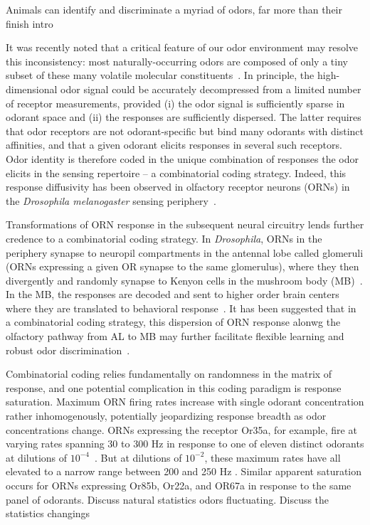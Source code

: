 
Animals can identify and discriminate a myriad of odors, far more than their {\color{blue} finish intro}

It was recently noted that a critical feature of our odor environment may resolve this inconsistency: most naturally-occurring odors are composed of only a tiny subset of these many volatile molecular constituents~\cite{vijay_1}. In principle, the high-dimensional odor signal could be accurately decompressed from a limited number of receptor measurements, provided (i) the odor signal is sufficiently sparse in odorant space and (ii) the responses are sufficiently dispersed. The latter requires that odor receptors are not odorant-specific but bind many odorants with distinct affinities, and that a given odorant elicits responses in several such receptors. Odor identity is therefore coded in the unique combination of responses the odor elicits in the sensing repertoire -- a combinatorial coding strategy. Indeed, this response diffusivity has been observed in olfactory receptor neurons (ORNs) in the  \textit{Drosophila melanogaster} sensing periphery~\cite{hallem_carlson}. 

Transformations of ORN response in the subsequent neural circuitry lends further credence to a combinatorial coding strategy. In \textit{Drosophila}, ORNs in the periphery synapse to neuropil compartments in the antennal lobe called glomeruli (ORNs expressing a given OR synapse to the same glomerulus), where they then divergently and randomly synapse to Kenyon cells in the mushroom body (MB)~\cite{early_olfactory_processing, abbott_axel}. In the MB, the responses are decoded and sent to higher order brain centers where they are translated to behavioral response~\cite{olfactory_map_chiang, mushroom_body_review}. It has been suggested that in a combinatorial coding strategy, this dispersion of ORN response alonwg the olfactory pathway from AL to MB may further facilitate flexible learning and robust odor discrimination~\cite{vijay_1}. 

Combinatorial coding relies fundamentally on randomness in the matrix of response, and one potential complication in this coding paradigm is response saturation. Maximum ORN firing rates increase with single odorant concentration rather inhomogenously, potentially jeopardizing response breadth as odor concentrations change. ORNs expressing the receptor Or35a, for example, fire at varying rates spanning 30 to 300 Hz in response to one of eleven distinct odorants at dilutions of $10^{-4}$~\cite{hallem_carlson}. But at dilutions of $10^{-2}$, these maximum rates have all elevated to a narrow range between 200 and 250 Hz
. Similar apparent saturation occurs for ORNs expressing Or85b, Or22a, and OR67a in response to the same panel of odorants. {\color{blue} Discuss natural statistics odors fluctuating.} {\color{blue} Discuss the statistics changings}

